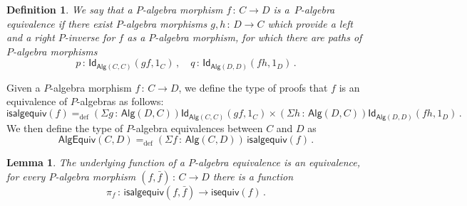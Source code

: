 \documentclass[10pt,a4paper,oneside,reqno]{amsart}
\numberwithin{equation}{section}
\theoremstyle{mythm}
\newtheorem{lemma}[theorem]{Lemma}
\theoremstyle{mydef}
\newtheorem{definition}[theorem]{Definition}
\theoremstyle{myrmk}
\newcommand{\ie}{\text{i.e.\ }}
\newcommand{\defeq}{=_{\mathrm{def}}}
\newcommand{\co}{\,{:}\,}
\newcommand{\Id}{\mathsf{Id}}
\newcommand{\Palg}{\mathsf{Alg}}
\newcommand{\isalgequiv}{\mathsf{isalgequiv}}
\newcommand{\AlgEquiv}{\mathsf{AlgEquiv}}
\begin{document}
\begin{definition}  
We say that a $P$-algebra morphism $f \co C \to D$ is 
 a~\emph{$P$-algebra equivalence}
if there exist $P$-algebra morphisms $g, h \co D \to C$  which provide a left and a right $P$-inverse for $f$ as a
$P$-algebra morphism, \ie for
which there are paths of $P$-algebra morphisms
\[ 
p \co \Id_{\Palg(C,C)}( g  f,  1_C) \, , \quad q \co \Id_{\Palg(D,D)}( f h , 1_D) \, .
\]
\end{definition}
 
Given a $P$-algebra morphism $f \co C \to D$, we define the type of proofs that $f$ is an equivalence of $P$-algebras as follows:
\[
\isalgequiv(f) \defeq  (\Sigma g \co  \Palg(D,C)) \Id_{\Palg(C,C)}( g f, 1_C )  \times 
    (\Sigma h  \co \Palg(D, C)) \Id_{\Palg(D,D)}( f h , 1_D ) \, .
\]
We then define the type of $P$-algebra equivalences between $C$ and $D$ as
\[
\AlgEquiv(C, D)
\defeq   (\Sigma f \co \Palg(C,D)) \, \isalgequiv(f)  \, . 
\] 


\begin{lemma} The underlying function of a $P$-algebra equivalence is an equivalence, \ie 
for every $P$-algebra morphism $(f, \bar{f}) \co C \to D$ there is a function 
\[
\pi_f \co \isalgequiv(f, \bar{f})  \to \mathsf{isequiv}(f)  \, .
\]
\end{lemma}
\end{document}
